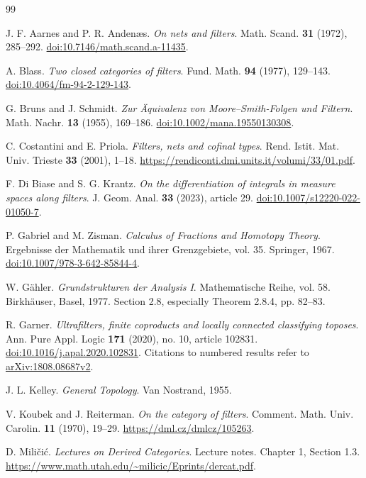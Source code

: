 \documentclass[11pt,a4paper]{article}
\theoremstyle{definition}
\theoremstyle{remark}
\begin{document}
\begin{thebibliography}{99}
\raggedright
{}
J. F. Aarnes and P. R. Anden\ae s.
\emph{On nets and filters}. Math. Scand. \textbf{31} (1972), 285--292.
\href{https://doi.org/10.7146/math.scand.a-11435}{doi:10.7146/math.scand.a-11435}.

A. Blass. \emph{Two closed categories of filters}.
Fund. Math. \textbf{94} (1977), 129--143.
\href{https://doi.org/10.4064/fm-94-2-129-143}{doi:10.4064/fm-94-2-129-143}.

G. Bruns and J. Schmidt.
\emph{Zur \"Aquivalenz von Moore--Smith-Folgen und Filtern}.
Math. Nachr. \textbf{13} (1955), 169--186.
\href{https://doi.org/10.1002/mana.19550130308}{doi:10.1002/mana.19550130308}.

C. Costantini and E. Priola. \emph{Filters, nets and cofinal types}.
Rend. Istit. Mat. Univ. Trieste \textbf{33} (2001), 1--18.
\url{https://rendiconti.dmi.units.it/volumi/33/01.pdf}.

F. Di Biase and S. G. Krantz.
\emph{On the differentiation of integrals in measure spaces along filters}.
J. Geom. Anal. \textbf{33} (2023), article 29.
\href{https://doi.org/10.1007/s12220-022-01050-7}{doi:10.1007/s12220-022-01050-7}.

P. Gabriel and M. Zisman. \emph{Calculus of Fractions and Homotopy Theory}.
Ergebnisse der Mathematik und ihrer Grenzgebiete, vol. 35. Springer, 1967.
\href{https://doi.org/10.1007/978-3-642-85844-4}{doi:10.1007/978-3-642-85844-4}.

W. G\"ahler. \emph{Grundstrukturen der Analysis I}.
Mathematische Reihe, vol. 58. Birkh\"auser, Basel, 1977.
Section 2.8, especially Theorem 2.8.4, pp. 82--83.

R. Garner. \emph{Ultrafilters, finite coproducts and locally connected
classifying toposes}. Ann. Pure Appl. Logic \textbf{171} (2020), no. 10,
article 102831.
\href{https://doi.org/10.1016/j.apal.2020.102831}{doi:10.1016/j.apal.2020.102831}.
Citations to numbered results refer to \href{https://arxiv.org/abs/1808.08687v2}{arXiv:1808.08687v2}.

J. L. Kelley. \emph{General Topology}. Van Nostrand, 1955.

V. Koubek and J. Reiterman. \emph{On the category of filters}.
Comment. Math. Univ. Carolin. \textbf{11} (1970), 19--29.
\url{https://dml.cz/dmlcz/105263}.

D. Mili\v{c}i\'c. \emph{Lectures on Derived Categories}.
Lecture notes. Chapter 1, Section 1.3.
\url{https://www.math.utah.edu/~milicic/Eprints/dercat.pdf}.


\end{thebibliography}
\end{document}
